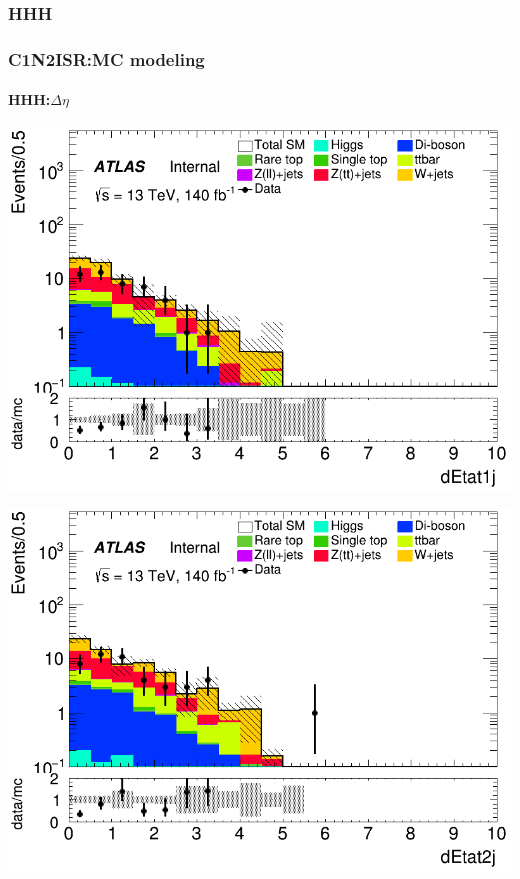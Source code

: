\documentclass[usenames,dvipsnames]{beamer}
\begin{document}
\subsubsection{HHH}
\begin{frame}
\frametitle{C1N2ISR:MC modeling}
\framesubtitle{HHH:\quad $\Delta\eta$}
    \begin{minipage}{0.32\textwidth}
        \centering
        \includegraphics[width=\textwidth]{graphics/HHH_met/HHH_met_dEtat1j.png}
    \end{minipage}
    \hfill
    \begin{minipage}{0.32\textwidth}
        \centering
        \includegraphics[width=\textwidth]{graphics/HHH_met/HHH_met_dEtat2j.png}
    \end{minipage}
    \hfill

\end{frame}
\end{document}
